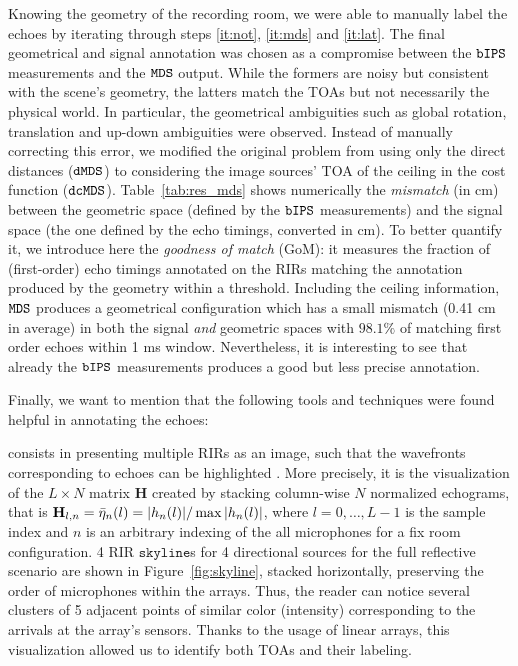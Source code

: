 Knowing the geometry of the recording room, we were able to manually label the echoes by iterating through steps \ref{it:not}, \ref{it:mds} and \ref{it:lat}.
The final geometrical and signal annotation was chosen as a compromise between the $\mathtt{bIPS}$ measurements and the $\mathtt{MDS}$ output. While the formers are noisy but consistent with the scene's geometry, the latters match the TOAs but not necessarily the physical world. In particular, the geometrical ambiguities such as global rotation, translation and up-down ambiguities were observed. Instead of manually correcting this error, we modified the original problem from using only the direct distances ($\mathtt{dMDS}$) to considering the  image sources' TOA of the ceiling in the cost function ($\mathtt{dcMDS}$). Table~\ref{tab:res_mds} shows numerically the \textit{mismatch} (in cm) between the geometric space (defined by the $\mathtt{bIPS}$ measurements) and the signal space (the one defined by the echo timings, converted in cm).  To better quantify it, we introduce here the \textit{goodness of match} (GoM): it measures the fraction of (first-order) echo timings annotated on the RIRs matching the annotation produced by the geometry within a threshold. Including the ceiling information, $\mathtt{MDS}$ produces a geometrical configuration which has a small mismatch (0.41 cm in average) in both the signal \textit{and} geometric spaces with $98.1\%$ of matching first order echoes within 1 ms window. Nevertheless, it is interesting to see that already the $\mathtt{bIPS}$ measurements produces a good but less precise annotation.



Finally, we want to mention that the following tools and techniques were found helpful in annotating the echoes:

 consists in presenting multiple RIRs as an image, such that the wavefronts corresponding to echoes can be highlighted . More precisely, it is the visualization of the $L \times N$ matrix $\mathbf{H}$ created by stacking column-wise $N$ normalized echograms, that is $\mathbf{H}_{l, n} =\bar{\eta}_{n}(l) = \kvbar{h_{n}(l)}/\max{\kvbar{h_{n}(l)}}$, where $l = 0, \dots, L-1$ is  the sample index and $n$ is an arbitrary indexing of the all microphones for a fix room configuration. 4 RIR $\mathtt{skyline}$s for 4 directional sources for the full reflective scenario are shown in Figure~\ref{fig:skyline}, stacked horizontally, preserving the order of microphones within the arrays. Thus, the reader can notice several clusters of 5 adjacent points of similar color (intensity) corresponding to the arrivals at the array's sensors. Thanks to the usage of linear arrays, this visualization allowed us to identify both TOAs and their labeling.

